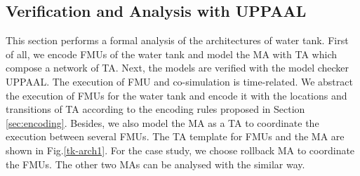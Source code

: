 \subsection{Verification and Analysis with UPPAAL}
\label{sec:mauppaal}
This section performs a formal analysis of the architectures of water tank. First of all, we encode FMUs of the water tank and model the MA with TA which compose a network of TA. Next, the models are verified with the model checker UPPAAL. The execution of FMU and co-simulation is time-related. We abstract the execution of FMUs for the water tank and encode it with the locations and transitions of TA according to the encoding rules proposed in Section \ref{sec:encoding}. Besides, we also model the MA as a TA to coordinate the execution between several FMUs. The TA template for FMUs and the MA are shown in Fig.\ref{tk-arch1}. For the case study, we choose rollback MA to coordinate the FMUs. The other two MAs can be analysed with the similar way. 

\begin{figure}[htbp]
\end{figure}

